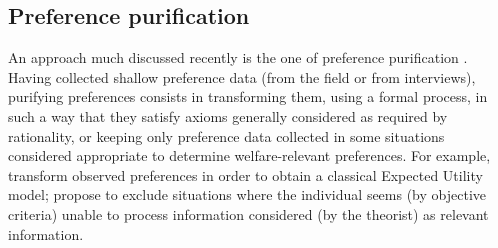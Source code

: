 \documentclass[version=last, pagesize, twoside=off, bibliography=totoc, DIV=calc, fontsize=12pt, a4paper, french, english]{scrartcl}
\begin{document}
\subsection{Preference purification}
\label{sec:purification}
An approach much discussed recently is the one of preference purification \citep{bernheim_beyond_2009, rubinstein_eliciting_2011, infante_preference_2016}.
Having collected shallow preference data (from the field or from interviews), purifying preferences consists in transforming them, using a formal process, in such a way that they satisfy axioms generally considered as required by rationality, or keeping only preference data collected in some situations considered appropriate to determine welfare-relevant preferences. 
For example, \citet{bleichrodt_making_2001} transform observed preferences in order to obtain a classical Expected Utility model; \citet[Section VII]{bernheim_beyond_2009} propose to exclude situations where the individual seems (by objective criteria) unable to process information considered (by the theorist) as relevant information.%
\end{document}
